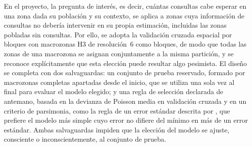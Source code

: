 En el proyecto, la pregunta de interés, es decir, cuántas consultas cabe esperar en una zona
dada su población y su contexto, se aplica a zonas cuya información de consultas no debería
intervenir en su propia estimación, incluidas las zonas pobladas sin consultas. Por ello, se
adopta la validación cruzada espacial por bloques con macrozonas H3 de resolución~6 como
bloques, de modo que todas las zonas de una macrozona se asignan conjuntamente a la misma
partición, y se reconoce explícitamente que esta elección puede resultar algo pesimista. El
diseño se completa con dos salvaguardas: un conjunto de prueba reservado, formado por
macrozonas completas apartadas desde el inicio, que se utiliza una sola vez al final para
evaluar el modelo elegido; y una regla de selección declarada de antemano, basada en la
devianza de Poisson media en validación cruzada y en un criterio de parsimonia, como la
regla de un error estándar descrita por \textcite{hastie2009}, que prefiere el modelo más
simple cuyo error no difiere del mínimo en más de un error estándar. Ambas salvaguardas
impiden que la elección del modelo se ajuste, consciente o inconscientemente, al conjunto de
prueba.
